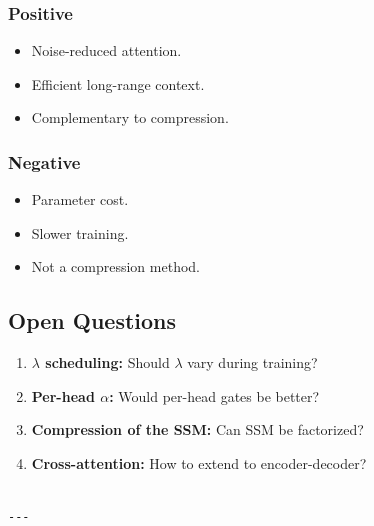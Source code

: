 \subsubsection{Positive}
\begin{itemize}
\item Noise-reduced attention.
\item Efficient long-range context.
\item Complementary to compression.

\end{itemize}
\subsubsection{Negative}
\begin{itemize}
\item Parameter cost.
\item Slower training.
\item Not a compression method.

\end{itemize}
\subsection{Open Questions}

\begin{enumerate}
\item \textbf{$\lambda$ scheduling:} Should $\lambda$ vary during training?
\item \textbf{Per-head $\alpha$:} Would per-head gates be better?
\item \textbf{Compression of the SSM:} Can SSM be factorized?
\item \textbf{Cross-attention:} How to extend to encoder-decoder?
\end{enumerate}
\begin{lstlisting}

---
\end{lstlisting}
